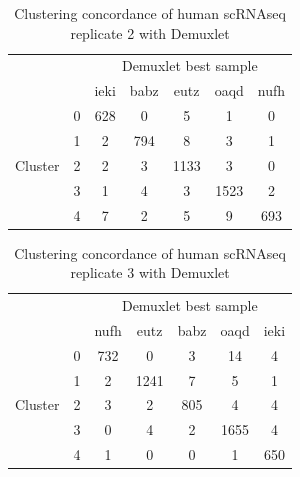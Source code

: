 \begin{table}[h!]
\begin{center}
\caption{Clustering concordance of human scRNAseq replicate 2 with Demuxlet}
\label{table:H2clust}
\begin{tabular}{ | c | c | c | c | c | c | c | } 
\hline
\multicolumn{2}{|c|}{} & \multicolumn{5}{c|}{Demuxlet best sample} \\
\cline{3-7}
\multicolumn{2}{|c|}{} & ieki & babz & eutz & oaqd & nufh \\
\hline
\multirow{6}{4em}{Cluster} & 0 & 628 & 0 & 5 & 1 & 0 \\
					 \cline{2-7}
                                           & 1 & 2 & 794 & 8 & 3 & 1 \\
                                           \cline{2-7}
                                           & 2 & 2 & 3 & 1133 & 3 & 0 \\
                                           \cline{2-7}
                                           & 3 & 1 & 4  & 3 & 1523 & 2 \\
                                           \cline{2-7}
                                           & 4 & 7 & 2 & 5 & 9 & 693 \\
                                           \hline
\end{tabular}
\end{center}
\end{table}

\begin{table}[h!]
\begin{center}
\caption{Clustering concordance of human scRNAseq replicate 3 with Demuxlet}
\label{table:H3clust}
\begin{tabular}{ | c | c | c | c | c | c | c | } 
\hline
\multicolumn{2}{|c|}{} & \multicolumn{5}{c|}{Demuxlet best sample} \\
\cline{3-7}
\multicolumn{2}{|c|}{} & nufh & eutz & babz & oaqd & ieki \\
\hline
\multirow{6}{4em}{Cluster} & 0 & 732 & 0 & 3 & 14 & 4 \\
					 \cline{2-7}
                                           & 1 & 2 & 1241 & 7 & 5 & 1 \\
                                           \cline{2-7}
                                           & 2 & 3 & 2 & 805 & 4 & 4 \\
                                           \cline{2-7}
                                           & 3 & 0 & 4  & 2 & 1655 & 4 \\
                                           \cline{2-7}
                                           & 4 & 1 & 0 & 0 & 1 & 650 \\
                                           \hline
\end{tabular}
\end{center}
\end{table}


